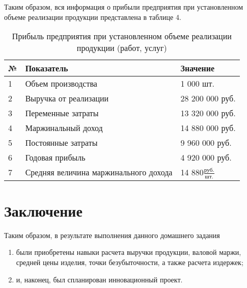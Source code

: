 Таким образом, вся информация о прибыли предприятия при установленном объеме реализации продукции представлена в таблице 4.

\begin{table}[h!]
	\caption{Прибыль предприятия при установленном объеме реализации продукции (работ, услуг)}
	\begin{tabular}{|p{1cm}|p{8cm}|p{7cm}|}
		\hline
		№ & Показатель & Значение \\
		\hline
		1 & Объем производства  & 1 000 шт. \\
		\hline
		2 & Выручка от реализации & 28 200 000 руб. \\
		\hline
		3 & Переменные затраты  & 13 320 000 руб. \\
		\hline
		4 & Маржинальный доход & 14 880 000 руб. \\
		\hline
		5 & Постоянные затраты & 9 960 000 руб. \\
		\hline
		6 & Годовая прибыль & 4 920 000 руб.  \\
		\hline
		7 & Средняя величина маржинального дохода & 14  880$\frac{\text{руб.}}{\text{шт.}}$ \\
		\hline
	\end{tabular}
\end{table}
\newpage
\section*{Заключение}
Таким образом, в результате выполнения данного домашнего задания
\begin{enumerate}
	  получены теоретические знания о том, как  правильно спланировать
	инновационный проект;\item были приобретены навыки расчета выручки продукции, валовой маржи,
	средней цены изделия, точки безубыточности, а также расчета
	издержек;\item и, наконец, был спланирован инновационный проект.
\end{enumerate}
